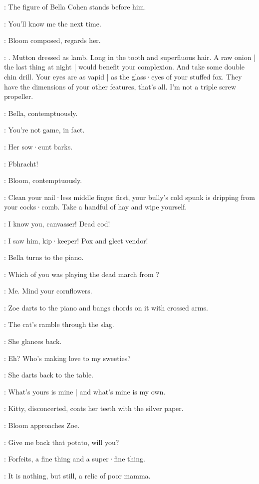 :
The figure of Bella Cohen stands before him.

\Bella:
You'll know me the next time.

:
Bloom composed,
regards her.

\Bloom:
.
Mutton dressed as lamb.
Long in the tooth and superfluous hair.
A raw onion |
the last thing at night |
would benefit your complexion.
And take some double chin drill.
Your eyes are as vapid |
as the glass·eyes of your stuffed fox.
They have the dimensions of your other features,
that's all.
I'm not a triple screw propeller.

:
Bella,
contemptuously.

\Bella:
You're not game,
in fact.

:
Her sow·cunt barks.

\Bella:
Fbhracht!%

:
Bloom,
contemptuously.

\Bloom:
Clean your nail·less middle finger first,
your bully's cold spunk is dripping from your cocks·comb.
Take a handful of hay and wipe yourself.

\Bella:
I know you,
canvasser!
Dead cod!

\Bloom:
I saw him,
kip·keeper!
Pox and gleet vendor!

:
Bella turns to the piano.

\Bella:
Which of you was playing the dead march from ?

\Zoe[4a]:
Me.
Mind your cornflowers.

:
Zoe darts to the piano and bangs chords on it with crossed arms.

\Zoe:
The cat's ramble through the slag.

:
She glances back.

\Zoe:
Eh?
Who's making love to my sweeties?

:
She darts back to the table.

\Zoe:
What's yours is mine |
and what's mine is my own.

:
Kitty,
disconcerted,
coats her teeth with the silver paper.

:
Bloom approaches Zoe.

\Bloom:
Give me back that potato,
will you?

\Zoe:
Forfeits,
a fine thing and a super·fine thing.

\Bloom:
It is nothing,
but still,
a relic of poor mamma.

